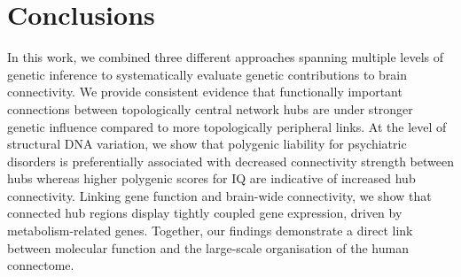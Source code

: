 \section{Conclusions}
In this work, we combined three different approaches spanning multiple levels of genetic inference to systematically evaluate genetic contributions to brain connectivity. We provide consistent evidence that functionally important connections between topologically central network hubs are under stronger genetic influence compared to more topologically peripheral links. At the level of structural DNA variation, we show that polygenic liability for psychiatric disorders is preferentially associated with decreased connectivity strength between hubs whereas higher polygenic scores for IQ are indicative of increased hub connectivity. Linking gene function and brain-wide connectivity, we show that connected hub regions display tightly coupled gene expression, driven by metabolism-related genes. Together, our findings demonstrate a direct link between molecular function and the large-scale organisation of the human connectome.
